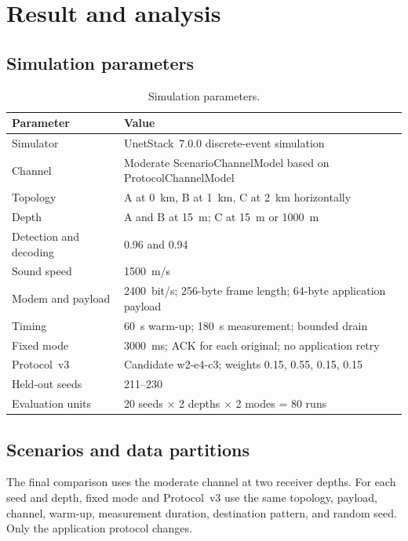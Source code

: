 \documentclass[11pt]{article}
\begin{document}
\clearpage
\section{Result and analysis}\label{sec:results}

\subsection{Simulation parameters}\label{sec:res-parameters}
\begin{table}[H]
\centering\small
\caption{Simulation parameters.}\label{tab:parameters}
\begin{tabular}{p{4.4cm} p{9.8cm}}
\toprule
Parameter & Value \\
\midrule
Simulator & UnetStack~7.0.0 discrete-event simulation \\
Channel & Moderate ScenarioChannelModel based on ProtocolChannelModel \\
Topology & A at 0~km, B at 1~km, C at 2~km horizontally \\
Depth & A and B at 15~m; C at 15~m or 1000~m \\
Detection and decoding & 0.96 and 0.94 \\
Sound speed & 1500~m/s \\
Modem and payload & 2400~bit/s; 256-byte frame length; 64-byte application payload \\
Timing & 60~s warm-up; 180~s measurement; bounded drain \\
Fixed mode & 3000~ms; ACK for each original; no application retry \\
Protocol~v3 & Candidate w2-e4-c3; weights 0.15, 0.55, 0.15, 0.15 \\
Held-out seeds & 211--230 \\
Evaluation units & 20 seeds $\times$ 2 depths $\times$ 2 modes = 80 runs \\
\bottomrule
\end{tabular}
\end{table}

\subsection{Scenarios and data partitions}\label{sec:res-scenarios}
\noindent
The final comparison uses the moderate channel at two receiver depths.
For each seed and depth, fixed mode and Protocol~v3 use the same topology, payload, channel, warm-up, measurement duration, destination pattern, and random seed.
Only the application protocol changes.
\end{document}
